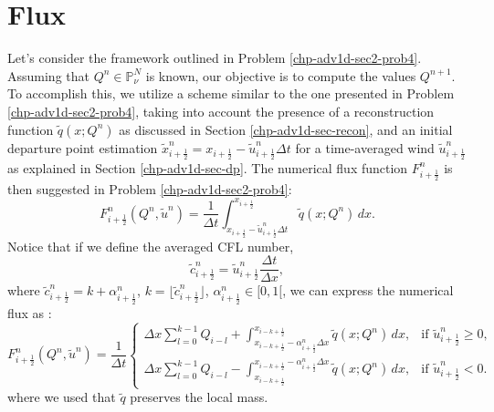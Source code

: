 \section{Flux}
\label{chp-adv1d-sec-flux}
Let's consider the framework outlined in Problem \ref{chp-adv1d-sec2-prob4}.
Assuming that $Q^{n} \in \mathbb{P}^{N}_{\nu}$ is known, our objective is to compute the values $Q^{n+1}$.
To accomplish this, we utilize a scheme similar to the one presented in Problem \ref{chp-adv1d-sec2-prob4},
taking into account the presence of a reconstruction function $\tilde{q}(x;Q^n)$ as discussed in Section
\ref{chp-adv1d-sec-recon}, and an initial departure point estimation
$\tilde{x}_{i+\frac{1}{2}}^n = {x}_{i+\frac{1}{2}} -\tilde{u}_{i+\frac{1}{2}}^n \Delta t$
for a time-averaged wind $\tilde{u}_{i+\frac{1}{2}}^n$ as explained in Section \ref{chp-adv1d-sec-dp}.
The numerical flux function ${F}^{n}_{i+\frac{1}{2}}$ is then suggested in Problem \ref{chp-adv1d-sec2-prob4}:
\begin{equation}
	\label{chp-sec-flux:numerical-flux1}
	{F}^{n}_{i+\frac{1}{2}}(Q^n,\tilde{u}^n)  = \frac{1}{\Delta t}
	\int_{x_{i+\frac{1}{2}}-\tilde{u}^n_{i+\frac{1}{2}}\Delta t}^{x_{i+\frac{1}{2}}}
	\tilde{q}(x;Q^n) \,dx.
\end{equation}
Notice that if we define the averaged CFL number,
\begin{equation*}
	\label{chp-sec-flux:cedges}
	\tilde{c}_{i+\frac{1}{2}}^n = \tilde{u}_{i+\frac{1}{2}}^n\frac{\Delta t}{\Delta x},
\end{equation*}
where $\tilde{c}_{i+\frac{1}{2}}^n = k + \alpha_{i+\frac{1}{2}}^n$, $k = \lfloor \tilde{c}_{i+\frac{1}{2}}^n \rfloor$,
$\alpha_{i+\frac{1}{2}}^n \in [0,1[$,
we can express the numerical flux as \citep{lin:1996, chen:2017}:
\begin{equation}
	\label{chp-sec-flux:numerical-flux}
	{F}_{i+\frac{1}{2}}^n(Q^n,\tilde{u}^n) =  \frac{1}{\Delta t}
	\begin{cases}
	\Delta x\sum_{l=0}^{k-1} Q_{i-l} +  
    \int_{x_{i-k+\frac{1}{2}}-{\alpha}^n_{i+\frac{1}{2}}\Delta x}^{x_{i-k+\frac{1}{2}}}
    \tilde{q}(x;Q^n) \,dx, & \text{if } \tilde{u}_{i+\frac{1}{2}}^n \geq 0,\\
	\Delta x\sum_{l=0}^{k-1} Q_{i-l} -  
    \int^{x_{i-k+\frac{1}{2}}-{\alpha}^n_{i+\frac{1}{2}}\Delta x}_{x_{i-k+\frac{1}{2}}}
    \tilde{q}(x;Q^n) \,dx, & \text{if } \tilde{u}_{i+\frac{1}{2}}^n < 0.
	\end{cases}
\end{equation}
where we used that $\tilde{q}$ preserves the local mass.

